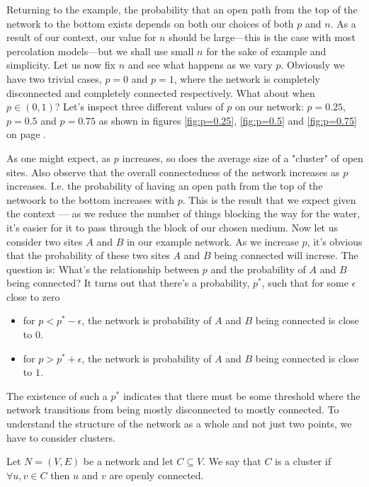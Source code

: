 Returning to the example, the probability that an open path from the top of the network to the bottom exists depends on both our choices of both $p$ and $n$. As a result of our context, our value for $n$ should be
large---this is the case with most percolation models---but we shall use small $n$ for the sake of example and simplicity. Let us now fix $n$ and see what happens as we vary $p$. Obviously we have two trivial cases, $p=0$ and $p=1$,
where the network is completely disconnected and completely connected respectively.
What about when $p\in(0,1)$? Let's inspect three different values of $p$ on our network: $p=0.25$, $p=0.5$ and $p=0.75$ as shown in figures \ref{fig:p=0.25}, \ref{fig:p=0.5} and
\ref{fig:p=0.75} on page \pageref{fig:probabilities}.

As one might expect, as $p$ increases, so does the average size of a "cluster" of open sites. Also observe that the overall connectedness of the network increases as $p$ increases.
I.e. the probability of having an open path from the top of the netwoork to the bottom increases with $p$. This is the result that we expect given the context --- as we reduce the
number of things blocking the way for the water, it's easier for it to pass through the block of our chosen medium. Now let us consider two sites $A$ and $B$ in our example
network. As we increase $p$, it's obvious that the probability of these two sites $A$ and $B$ being connected will increse. The question is: What's the relationship between $p$ and
the probability of $A$ and $B$ being connected? It turns out that there's a probability, $p^*$, such that for some $\epsilon$ close to zero
\begin{itemize}
  \item for $p < p^* - \epsilon$, the network is probability of $A$ and $B$ being connected is close to $0$.
  \item for $p > p^* + \epsilon$, the network is probability of $A$ and $B$ being connected is close to $1$.
\end{itemize}

The existence of such a $p^*$ indicates that there must be some threshold where the network transitions from being mostly disconnected to mostly connected. To understand the
structure of the network as a whole and not just two points, we have to consider clusters.

\begin{definition}\label{def:cluster}
  Let $N = (V, E)$ be a network and let $C \subseteq V$. We say that $C$ is a cluster if $\forall u, v \in C$ then $u$ and $v$ are openly connected.
\end{definition}

